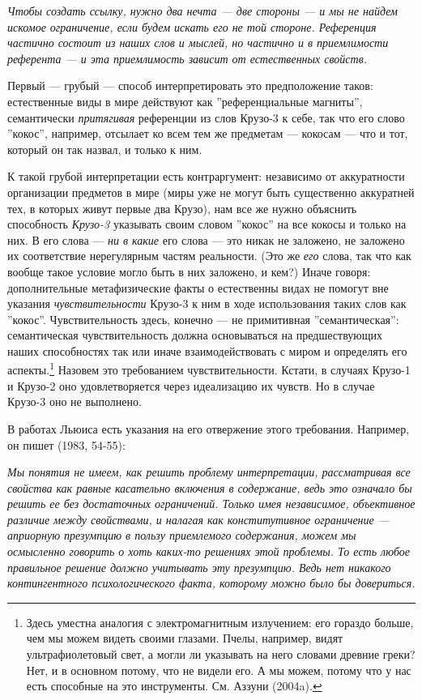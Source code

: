 \documentclass[11pt]{book}
\begin{document}
\smallskip

\textit{Чтобы создать ссылку, нужно два нечта --- две стороны --- и мы не найдем искомое ограничение, если будем искать его не той стороне. Референция частично состоит из наших слов и мыслей, но частично и в приемлимости референта --- и эта приемлимость зависит от естественных свойств.}

\smallskip

Первый --- грубый --- способ интерпретировать это предположение таков: естественные виды в мире действуют как ''референциальные магниты'', семантически \textit{притягивая} референции из слов Крузо-3 к себе, так что его слово ''кокос'', например, отсылает ко всем тем же предметам --- кокосам --- что и тот, который он так назвал, и только к ним.

К такой грубой интерпретации есть контраргумент: независимо от аккуратности организации предметов в мире (миры уже не могут быть существенно аккуратней тех, в которых живут первые два Крузо), нам все же нужно объяснить способность \textit{Крузо-3} указывать своим словом ''кокос'' на все кокосы и только на них. В его слова --- \textit{ни в какие} его слова --- это никак не заложено,  не заложено их соответствие нерегулярным частям реальности. (Это же \textit{его} слова, так что как вообще такое условие могло быть в них заложено, и кем?) Иначе говоря: дополнительные метафизические факты о естественны видах не помогут вне указания \textit{чувствительности} Крузо-3 к ним в ходе использования таких слов как ''кокос''. Чувствительность здесь, конечно --- не примитивная ''семантическая'': семантическая чувствительность должна основываться на предшествующих наших способностях так или иначе взаимодействовать с миром и определять его аспекты.\footnote{Здесь уместна аналогия с электромагнитным излучением: его гораздо больше, чем мы можем видеть своими глазами. Пчелы, например, видят ультрафиолетовый свет, а могли ли указывать на него словами древние греки? Нет, и в основном потому, что не видели его. А мы можем, потому что у нас есть способные на это инструменты. См. Аззуни (2004a).} Назовем это требованием чувствительности. Кстати, в случаях Крузо-1 и Крузо-2 оно удовлетворяется через идеализацию их чувств. Но в случае Крузо-3 оно не выполнено.

В работах Льюиса есть указания на его отвержение этого требования. Например, он пишет (1983, 54-55):

\smallskip

\textit{Мы понятия не имеем, как решить проблему интерпретации, рассматривая все свойства как равные касательно включения в содержание, ведь это означало бы решить ее без достаточных ограничений. Только имея независимое, объективное различие между свойствами, и налагая как конститутивное ограничение --- \textit{априорную} презумпцию в пользу приемлемого содержания, можем мы осмысленно говорить о хоть каких-то решениях этой проблемы. То есть любое правильное решение должно учитывать эту презумпцию. Ведь нет никакого контингентного психологического факта, которому можно было бы довериться.}
\end{document}
